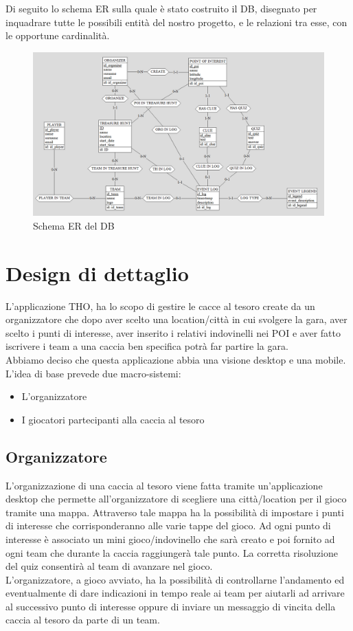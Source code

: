 \documentclass[12pt, italian]{article}
\begin{document}
Di seguito lo schema ER sulla quale è stato costruito il DB, disegnato per inquadrare tutte le possibili entità del nostro progetto, e le relazioni tra esse, con le opportune cardinalità. 

\begin{figure}[H]
	\centering
	\includegraphics[width=1\textwidth]{img/ER.png}
	\caption{Schema ER del DB}
\end{figure}

\newpage
\section{Design di dettaglio}
L'applicazione THO, ha lo scopo di gestire le cacce al tesoro create da un organizzatore che dopo aver scelto una location/città in cui svolgere la gara, aver scelto i punti di interesse, aver inserito i relativi indovinelli nei POI e aver fatto iscrivere i team a una caccia ben specifica potrà far partire la gara.
\\Abbiamo deciso che questa applicazione abbia una visione desktop e una mobile.
L’idea di base prevede due macro-sistemi:
\begin{itemize}
	\item L'organizzatore
	\item I giocatori partecipanti alla caccia al tesoro
\end{itemize}
\subsection{Organizzatore}
L’organizzazione di una caccia al tesoro viene fatta tramite un’applicazione desktop che permette all'organizzatore di scegliere una città/location per il gioco tramite una mappa. Attraverso tale mappa ha la possibilità di impostare i punti di interesse che corrisponderanno alle varie tappe del gioco. Ad ogni punto di interesse è associato un mini gioco/indovinello che sarà creato e poi fornito ad ogni team che durante la caccia raggiungerà tale punto. La corretta risoluzione del quiz consentirà al team di avanzare nel gioco.\\
L'organizzatore, a gioco avviato, ha la possibilità di controllarne l'andamento ed eventualmente di dare indicazioni in tempo reale ai team per aiutarli ad arrivare al successivo punto di interesse oppure di inviare un messaggio di vincita della caccia al tesoro da parte di un team.\\
\end{document}
